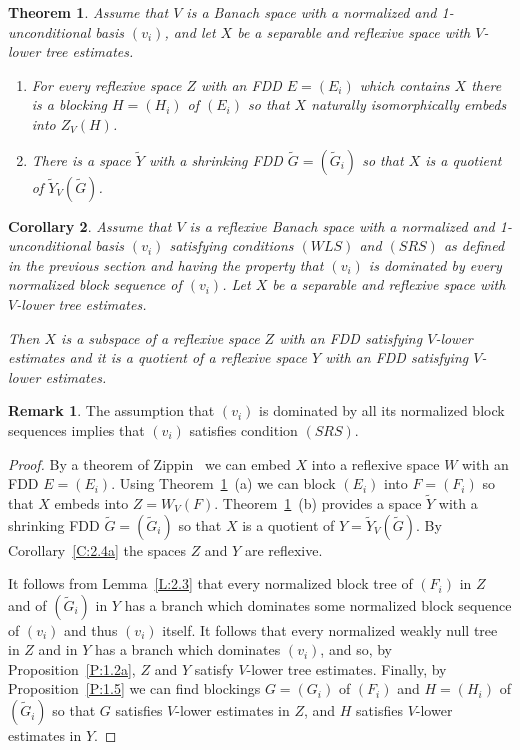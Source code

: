 \documentclass[11pt,leqno]{amsart}
\newtheorem{thm}{Theorem}[section]
\newtheorem{cor}[thm]{Corollary}
\theoremstyle{definition}
\newtheorem*{remark}{Remark}
\newcommand{\Gt}{\tilde G}
\newcommand{\Yt}{\tilde Y}
\begin{document}
\begin{thm}\label{T:3.1}
  Assume that $V$ is a Banach space with a normalized and
  1-unconditional basis $(v_i)$, and let $X$ be a  separable and
  reflexive space with $V$-lower tree estimates.
  \begin{enumerate}
  \item[a)]
    For every  reflexive space $Z$ with an FDD $E=(E_i)$ which
    contains $X$ there is a blocking $H=(H_i)$ of $(E_i)$ so that $X$
    naturally isomorphically embeds into $Z_V(H)$.
  \item[b)]
    There is a space $\Yt$ with a shrinking FDD $\Gt=(\Gt_i)$ so that
    $X$ is a quotient of $\Yt_V(\Gt)$.
  \end{enumerate}
\end{thm}
\begin{cor}\label{C:3.2}
  Assume that $V$ is a reflexive Banach space with a normalized and
  1-unconditional basis $(v_i)$ satisfying conditions  $(WLS)$ and
  $(SRS)$ as defined in the previous section and having the property
  that $(v_i)$ is dominated by every normalized block sequence of
  $(v_i)$. Let $X$ be a  separable and reflexive space with $V$-lower
  tree estimates.

  Then $X$ is a subspace of a reflexive space $Z$ with an FDD
  satisfying $V$-lower estimates and it is a quotient of a reflexive
  space $Y$ with an FDD satisfying $V$-lower estimates.
\end{cor}
\begin{remark}
  The assumption that $(v_i)$ is dominated by all its normalized block
  sequences implies that $(v_i)$ satisfies condition $(SRS)$.
\end{remark}
\begin{proof}
  By a theorem of Zippin~\cite{Z} we can embed $X$ into a reflexive
  space $W$ with an FDD $E=(E_i)$. Using Theorem~\ref{T:3.1}~(a) we
  can block $(E_i)$ into $F=(F_i)$ so that $X$ embeds into
  $Z=W_V(F)$. Theorem~\ref{T:3.1}~(b) provides a space $\Yt$ with a
  shrinking FDD $\Gt=(\Gt_i)$ so that $X$ is a quotient of
  $Y=\Yt_V(\Gt)$. By Corollary~\ref{C:2.4a} the spaces  $Z$ and  $Y$
  are reflexive.
 
  It follows from Lemma~\ref{L:2.3} that every normalized  block tree
  of $(F_i)$ in $Z$
  and of $(\Gt_i)$ in $Y$ has a branch which dominates some normalized
  block sequence of $(v_i)$ and thus $(v_i)$ itself. It follows that
  every normalized weakly null tree in $Z$ and in $Y$ has a branch
  which dominates $(v_i)$, and so, by  Proposition~\ref{P:1.2a}, $Z$
  and $Y$ satisfy $V$-lower  tree estimates. Finally, by
  Proposition~\ref{P:1.5} we can find blockings $G=(G_i)$ of $(F_i)$
  and $H=(H_i)$ of $(\Gt_i)$ so that $G$ satisfies $V$-lower
  estimates in $Z$, and $H$ satisfies $V$-lower  estimates in $Y$.
\end{proof}
\end{document}
